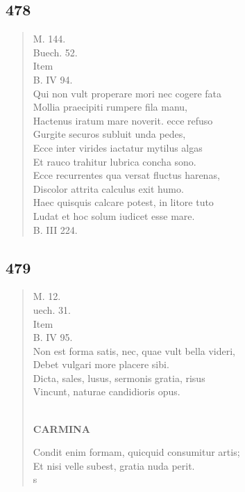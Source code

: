 \documentclass[11pt, a4paper]{report}
\begin{document}
            \subsection*{478}
      \begin{verse}
      M. 144. \\ Buech. 52. \\ Item \\ B. IV 94. \\ Qui non vult properare mori nec cogere fata \\ Mollia praecipiti rumpere fila manu, \\ Hactenus iratum mare noverit. ecce refuso \\ Gurgite securos subluit unda pedes, \\ Ecce inter virides iactatur mytilus algas \\ Et rauco trahitur lubrica concha sono. \\ Ecce recurrentes qua versat fluctus harenas, \\ Discolor attrita calculus exit humo. \\ Haec quisquis calcare potest, in litore tuto \\ Ludat et hoc solum iudicet esse mare. \\ B. III 224. \\ 
      \end{verse}
  
            \subsection*{479}
      \begin{verse}
      M. 12. \\ uech. 31. \\ Item \\ B. IV 95. \\ Non est forma satis, nec, quae vult bella videri, \\ Debet vulgari more placere sibi. \\ Dicta, sales, lusus, sermonis gratia, risus \\ Vincunt, naturae candidioris opus. \\ 
        ﻿\pagebreak 
     \marginpar{[350]} \begin{center} \textbf{CARMINA} \end{center}Condit enim formam, quicquid consumitur artis; \\ Et nisi velle subest, gratia nuda perit. \\ s \\ 
      \end{verse}
  
\end{document}
